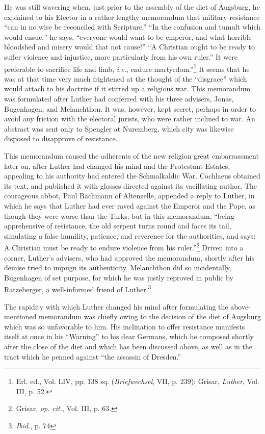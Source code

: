 He was still wavering when, just prior to the assembly of the diet of
Augsburg, he explained to his Elector in a rather lengthy memorandum
that military resistance “can in no wise be reconciled with Scripture.”
“In the confusion and tumult which would ensue,” he says,
“everyone would want to be emperor, and what horrible bloodshed and
misery would that not cause!” “A Christian ought to be ready to suffer
violence and injustice, more particularly from his own ruler.” It were
preferable to sacrifice life and limb, \textit{i.e.}, endure martyrdom.”\footnote
{Erl. ed., Vol. LIV, pp. 138 sq. (\textit{Briefwechsel}, VII, p. 239); Grisar, \textit{Luther}, Vol. III,
p. 52.}
It seems
that he was at that time very much frightened at the thought of the
“disgrace” which would attach to his doctrine if it stirred up a religious
war. This memorandum was formulated after Luther had conferred
with his three advisers, Jonas, Bugenhagen, and Melanchthon. It was,
however, kept secret, perhaps in order to avoid any friction with the
electoral jurists, who were rather inclined to war. An abstract was sent
only to Spengler at Nuremberg, which city was likewise disposed to disapprove of resistance.

This memorandum caused the adherents of the new religion great
embarrassment later on, after Luther had changed his mind and the
Protestant Estates, appealing to his authority had entered the Schmalkaldic
War. Cochlaeus obtained its text, and published it with glosses
directed against its vacillating author. The courageous abbot, Paul
Bachmann of Altenzelle, appended a reply to Luther, in which he says
that Luther had ever raved against the Emperor and the Pope, as
though they were worse than the Turks; but in this memorandum,
“being apprehensive of resistance, the old serpent turns round and
faces its tail, simulating a false humility, patience, and reverence for
the authorities, and says: A Christian must be ready to endure violence
from his ruler.”\footnote{Grisar, \textit{op. cit.}, Vol. III, p. 63.}
Driven into a corner, Luther’s advisers, who
had approved the memorandum, shortly after his demise tried to impugn
its authenticity. Melanchthon did so incidentally, Bugenhagen
of set purpose, for which he was justly reproved in public by Ratzeberger,
a well-informed friend of Luther.\footnote{\textit{Ibid.}, p. 74}

The rapidity with which Luther changed his mind after formulating the
above-mentioned memorandum was chiefly owing to the
decision of the diet of Augsburg which was so unfavorable to him.
His inclination to offer resistance manifests itself at once in his
“Warning” to his dear Germans, which he composed shortly after
the close of the diet and which has been discussed above, as well as
in the tract which he penned against “the assassin of Dresden.”

